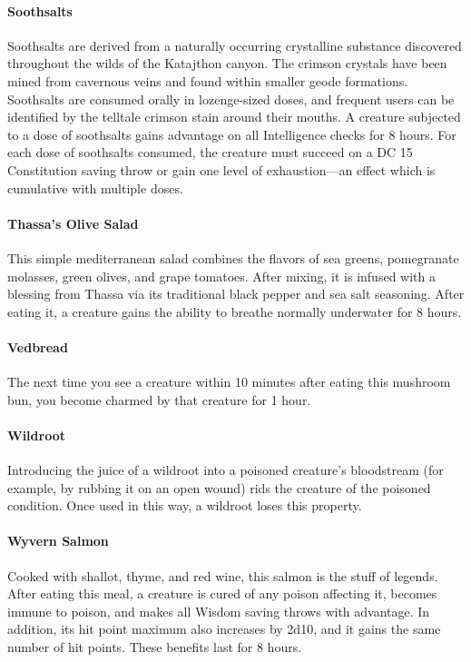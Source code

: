     \paragraph{Soothsalts}
		Soothsalts are derived from a naturally occurring crystalline substance discovered throughout the wilds of the Katajthon canyon.
        The crimson crystals have been mined from cavernous veins and found within smaller geode formations.
        Soothsalts are consumed orally in lozenge-sized doses, and frequent users can be identified by the telltale crimson stain around their mouths.
        A creature subjected to a dose of soothsalts gains advantage on all Intelligence checks for 8 hours.
		For each dose of soothsalts consumed, the creature must succeed on a DC 15 Constitution saving throw or gain one level of exhaustion---an effect which is cumulative with multiple doses.
    \paragraph{Thassa's Olive Salad}
        This simple mediterranean salad combines the flavors of sea greens, pomegranate molasses, green olives, and grape tomatoes.
        After mixing, it is infused with a blessing from Thassa via its traditional black pepper and sea salt seasoning.
        After eating it, a creature gains the ability to breathe normally underwater for 8 hours.
    \paragraph{Vedbread}
        The next time you see a creature within 10 minutes after eating this mushroom bun, you become charmed by that creature for 1 hour.
    \paragraph{Wildroot}
        Introducing the juice of a wildroot into a poisoned creature's bloodstream (for example, by rubbing it on an open wound) rids the creature of the poisoned condition.
        Once used in this way, a wildroot loses this property.
    \paragraph{Wyvern Salmon}
        Cooked with shallot, thyme, and red wine, this salmon is the stuff of legends.
        After eating this meal, a creature is cured of any poison affecting it, becomes immune to poison, and makes all Wisdom saving throws with advantage.
        In addition, its hit point maximum also increases by 2d10, and it gains the same number of hit points.
        These benefits last for 8 hours.
